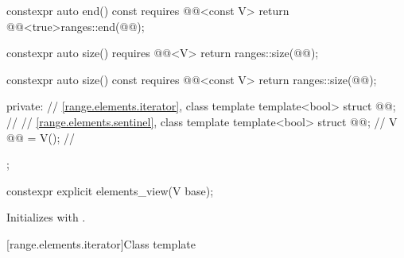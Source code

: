 \begin{codeblock}
{{    constexpr auto end() const requires @@<const V>
    { return @@<true>{ranges::end(@@)}; }

    constexpr auto size() requires @@<V>
    { return ranges::size(@@); }

    constexpr auto size() const requires @@<const V>
    { return ranges::size(@@); }

  private:
    // \ref{range.elements.iterator}, class template 
    template<bool> struct @@;                     // \expos
    // \ref{range.elements.sentinel}, class template 
    template<bool> struct @@;                     // \expos
    V @@ = V();                                      // \expos
  };
}
\end{codeblock}

%
\begin{itemdecl}
constexpr explicit elements_view(V base);
\end{itemdecl}

\begin{itemdescr}
\pnum
\effects
Initializes  with .
\end{itemdescr}

[range.elements.iterator]{Class template }


